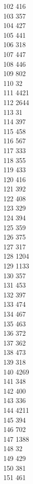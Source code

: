 { 102	416 \\
 103	357 \\
 104	427 \\
 105	441 \\
 106	318 \\
 107	447 \\
 108	446 \\
 109	802 \\
 110	32 \\
 111	4421 \\
 112	2644 \\
 113	31 \\
 114	397 \\
 115	458 \\
 116	567 \\
 117	333 \\
 118	355 \\
 119	433 \\
 120	416 \\
 121	392 \\
 122	408 \\
 123	329 \\
 124	394 \\
 125	359 \\
 126	375 \\
 127	317 \\
 128	1204 \\
 129	1133 \\
 130	357 \\
 131	453 \\
 132	397 \\
 133	474 \\
 134	467 \\
 135	463 \\
 136	372 \\
 137	362 \\
 138	473 \\
 139	318 \\
 140	4269 \\
 141	348 \\
 142	400 \\
 143	336 \\
 144	4211 \\
 145	394 \\
 146	702 \\
 147	1388 \\
 148	32 \\
 149	429 \\
 150	381 \\
 151	461 \\
}
